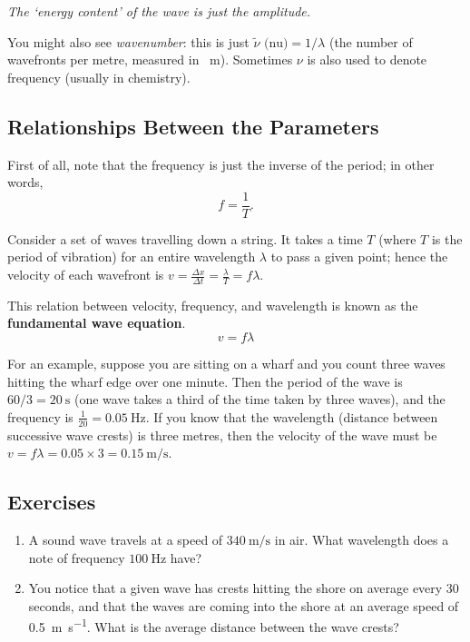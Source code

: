 \documentclass[a4paper]{amsbook}
\begin{document}
\textit{The `energy content' of the wave is just the amplitude.}

You might also see \textit{wavenumber}: this is just $ \tilde\nu\text{ (nu)} = 1/\lambda $ (the number of wavefronts per metre, measured
in \si{\per\metre}). Sometimes $ \nu $ is also used to denote frequency (usually in chemistry).

\subsection{Relationships Between the Parameters}
First of all, note that the frequency is just the inverse of the period; in other words,
\begin{equation}
  f = \frac{1}{T}.
\end{equation}

Consider a set of waves travelling down a string. It takes a time $ T $ (where $ T $ is the period of vibration) for an entire
wavelength $ \lambda $ to pass a given point; hence the velocity of each wavefront is $ v = \frac{\Delta x}{\Delta t} = \frac{\lambda}{T} = f \lambda $.

This relation between velocity, frequency, and wavelength is known as the \textbf{fundamental wave equation}.
\begin{equation}
  v = f \lambda
\end{equation}

For an example, suppose you are sitting on a wharf and you count three waves hitting the wharf edge over one minute. Then
the period of the wave is $ 60/3 = \SI{20}{\second} $ (one wave takes a third of the time taken by three waves), and the
frequency is $ \frac{1}{20} = \SI{0.05}{\hertz} $. If you know that the wavelength (distance between successive wave crests)
is three metres, then the velocity of the wave must be $ v = f\lambda = 0.05 \times 3 = \SI{0.15}{\metre\per\second} $.

\subsection{Exercises}
\begin{enumerate}
  \item A sound wave travels at a speed of $ \SI{340}{\metre\per\second} $ in air. What wavelength does
        a note of frequency $ \SI{100}{\hertz} $ have?
  \item You notice that a given wave has crests hitting the shore on average every 30 seconds, and that the waves are coming into
        the shore at an average speed of \SI{0.5}{\metre\per\second}. What is the average distance between the wave crests?
\end{enumerate}
\end{document}
